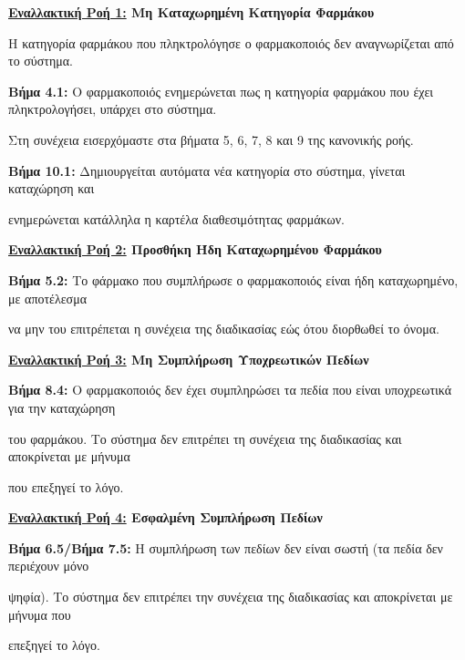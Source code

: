 \documentclass{article}
\begin{document}
  \textbf{\underline{Εναλλακτική Ροή 1:} Μη Καταχωρημένη Κατηγορία Φαρμάκου}  \vspace{0.1cm}
\par Η κατηγορία φαρμάκου που πληκτρολόγησε ο φαρμακοποιός δεν  αναγνωρίζεται από το σύστημα. \vspace{0.1cm}
\par \textbf{Βήμα 4.1:} Ο φαρμακοποιός ενημερώνεται πως η κατηγορία φαρμάκου που έχει πληκτρολογήσει,  υπάρχει στο σύστημα. \vspace{0.1cm}
\par Στη συνέχεια εισερχόμαστε στα βήματα 5, 6, 7, 8 και 9 της κανονικής ροής. \vspace{0.1cm}
\par \textbf{Βήμα 10.1:} Δημιουργείται αυτόματα νέα κατηγορία στο σύστημα, γίνεται καταχώρηση και \par ενημερώνεται κατάλληλα η καρτέλα διαθεσιμότητας φαρμάκων.

\vspace{0.2cm}
 
\textbf{\underline{Εναλλακτική Ροή 2:} Προσθήκη Ήδη Καταχωρημένου Φαρμάκου} \vspace{0.2cm} 
\par \textbf{Βήμα 5.2:} Το φάρμακο που συμπλήρωσε ο φαρμακοποιός είναι ήδη καταχωρημένο, με αποτέλεσμα \par να μην του επιτρέπεται η συνέχεια της διαδικασίας εώς ότου διορθωθεί το όνομα.\vspace{0.1cm}

\vspace{0.2cm}

\textbf{\underline{Εναλλακτική Ροή 3:} Μη Συμπλήρωση Υποχρεωτικών Πεδίων} \vspace{0.2cm} 
\par \textbf{Βήμα 8.4:} Ο φαρμακοποιός δεν έχει συμπληρώσει τα πεδία που είναι υποχρεωτικά για την καταχώρηση \par του φαρμάκου. Το σύστημα δεν επιτρέπει τη συνέχεια της διαδικασίας και αποκρίνεται με μήνυμα \par που επεξηγεί το λόγο. \vspace{0.2cm}

\textbf{\underline{Εναλλακτική Ροή 4:} Εσφαλμένη Συμπλήρωση Πεδίων} \vspace{0.2cm} 
\par \textbf{Βήμα 6.5/Βήμα 7.5:} Η συμπλήρωση των πεδίων δεν είναι σωστή (τα πεδία δεν περιέχουν μόνο \par ψηφία). Το σύστημα δεν επιτρέπει την συνέχεια της διαδικασίας και αποκρίνεται με μήνυμα που \par επεξηγεί το λόγο.
\end{document}
